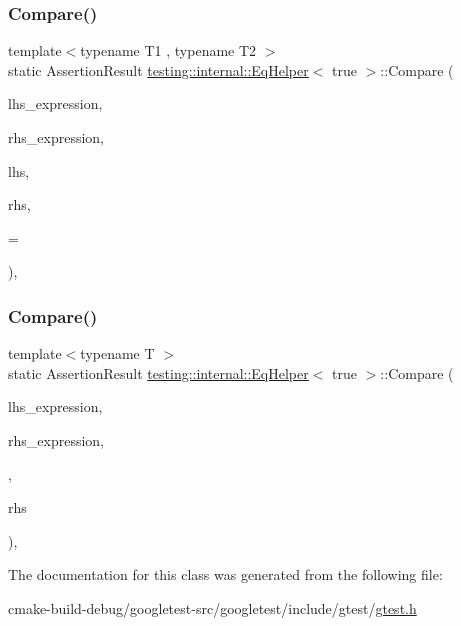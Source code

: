 \subsubsection{\texorpdfstring{Compare()}{Compare()}\hspace{0.1cm}{\footnotesize\ttfamily [1/2]}}
{\footnotesize\ttfamily template$<$typename T1 , typename T2 $>$ \\
static Assertion\+Result \mbox{\hyperlink{classtesting_1_1internal_1_1EqHelper}{testing\+::internal\+::\+Eq\+Helper}}$<$ true $>$\+::Compare (\begin{DoxyParamCaption}\item[{const char $\ast$}]{lhs\+\_\+expression,  }\item[{const char $\ast$}]{rhs\+\_\+expression,  }\item[{const T1 \&}]{lhs,  }\item[{const T2 \&}]{rhs,  }\item[{typename \mbox{\hyperlink{structtesting_1_1internal_1_1EnableIf}{Enable\+If}}$<$!\mbox{\hyperlink{structtesting_1_1internal_1_1is__pointer}{is\+\_\+pointer}}$<$ T2 $>$\+::value $>$\+::type $\ast$}]{ = {} }\end{DoxyParamCaption})\hspace{0.3cm}{\ttfamily [inline]}, {\ttfamily [static]}}

\mbox{\label{classtesting_1_1internal_1_1EqHelper_3_01true_01_4_a6f292601a68c8f0d49e6d48bd309b900}} 
\subsubsection{\texorpdfstring{Compare()}{Compare()}\hspace{0.1cm}{\footnotesize\ttfamily [2/2]}}
{\footnotesize\ttfamily template$<$typename T $>$ \\
static Assertion\+Result \mbox{\hyperlink{classtesting_1_1internal_1_1EqHelper}{testing\+::internal\+::\+Eq\+Helper}}$<$ true $>$\+::Compare (\begin{DoxyParamCaption}\item[{const char $\ast$}]{lhs\+\_\+expression,  }\item[{const char $\ast$}]{rhs\+\_\+expression,  }\item[{Secret $\ast$}]{,  }\item[{T $\ast$}]{rhs }\end{DoxyParamCaption})\hspace{0.3cm}{\ttfamily [inline]}, {\ttfamily [static]}}



The documentation for this class was generated from the following file\+:\begin{DoxyCompactItemize}
\item 
cmake-\/build-\/debug/googletest-\/src/googletest/include/gtest/\mbox{\hyperlink{gtest_8h}{gtest.\+h}}\end{DoxyCompactItemize}
